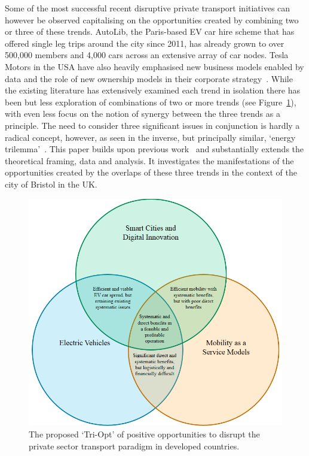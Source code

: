 \documentclass[b5paper,10pt]{article}
\begin{document}
Some of the most successful recent disruptive private transport
initiatives can however be observed capitalising on the opportunities
created by combining two or three of these trends. AutoLib, the
Paris-based EV car hire scheme that has offered single leg trips
around the city since 2011, has already grown to over 500,000 members
and 4,000 cars across an extensive array of car nodes. Tesla Motors in
the USA have also heavily emphasised new business models enabled by
data and the role of new ownership models in their corporate
strategy~\citep{musk:2016}. While the existing literature has
extensively examined each trend in isolation there has been but less
exploration of combinations of two or more trends (see
Figure~\ref{fig:triopt}), with even less focus on the notion of
synergy between the three trends as a principle. The need to consider
three significant issues in conjunction is hardly a radical concept,
however, as seen in the inverse, but principally similar, `energy
trilemma'~\citep{wec:2015}. This paper builds upon previous
work~\citep{cooper-et-al-sose:2015} and substantially extends the
theoretical framing, data and analysis. It investigates the
manifestations of the opportunities created by the overlaps of these
three trends in the context of the city of Bristol in the UK.

\begin{figure}[htb]
\centering
\includegraphics[width=0.6\columnwidth]{images/triopt.png}
\caption{The proposed `Tri-Opt' of positive opportunities to disrupt
  the private sector transport paradigm in developed countries.}
\label{fig:triopt}
\end{figure}

\end{document}
